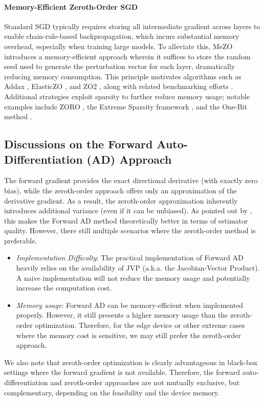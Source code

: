 \documentclass{article}
\theoremstyle{definition}
\theoremstyle{plain}
\theoremstyle{remark}
\begin{document}
\paragraph{Memory-Efficient Zeroth-Order SGD}  
Standard SGD typically requires storing all intermediate gradient across layers to enable chain-rule-based backpropagation, which incurs substantial memory overhead, especially when training large models. To alleviate this, MeZO \citep{malladi2023fine} introduces a memory-efficient approach wherein it suffices to store the random seed used to generate the perturbation vector for each layer, dramatically reducing memory consumption. This principle motivates algorithms such as Addax \citep{li2024addax}, ElasticZO \citep{sugiura2025elasticzo}, and ZO2 \citep{wang2025zo2}, along with related benchmarking efforts \citep{zhang2024revisiting,gautam2024variance,wang2024simultaneous,guo2024zeroth}. Additional strategies exploit sparsity to further reduce memory usage; notable examples include ZORO \citep{cai2022zeroth}, the Extreme Sparsity framework \citep{guo2024zeroth}, and the One-Bit method \citep{cai2022one}.
 
\subsection{Discussions on the Forward Auto-Differentiation (AD) Approach}
The forward gradient \citep{griewank2008evaluating} provides the exact directional derivative (with exactly zero bias), while the zeroth-order approach offers only an approximation of the derivative gradient. As a result, the zeroth-order approximation inherently introduces additional variance (even if it can be unbiased). As pointed out by \citet{zhang2024revisiting}, this makes the Forward AD method theoretically better in terms of estimator quality. However, there still multiple scenarios where  the zeroth-order method is preferable.  
\begin{itemize}
    \item \textit{Implementation Difficulty}: The practical implementation of Forward AD heavily relies on the availability of JVP (a.k.a. the Jacobian-Vector Product). A naive implementation will not reduce the memory usage and potentially increase the computation cost.  

    \item \textit{Memory usage}:  Forward AD can be memory-efficient when implemented properly.  However, it still presents a higher memory usage  than the zeroth-order optimization.  Therefore, for the edge device or other extreme cases where the memory cost is sensitive, we may still prefer the zeroth-order approach.
\end{itemize}
We also note that  zeroth-order optimization is clearly advantageous in black-box settings where the forward gradient is not available. Therefore, the forward auto-differentiation and zeroth-order approaches are not mutually exclusive, but complementary, depending on the feasibility and the device memory.
\end{document}
